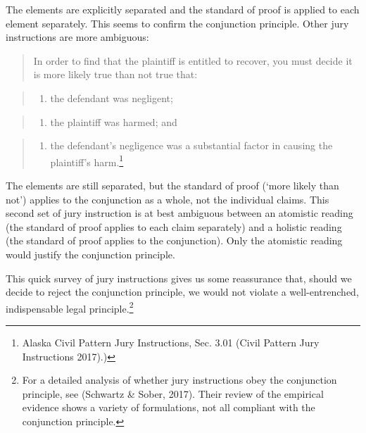 \documentclass[
  10pt,
  dvipsnames,enabledeprecatedfontcommands]{scrartcl}
\providecommand{\tightlist}{%
  \setlength{\itemsep}{0pt}\setlength{\parskip}{0pt}}
\begin{document}
\noindent The elements are explicitly separated and the standard of
proof is applied to each element separately. This seems to confirm the
conjunction principle. Other jury instructions are more ambiguous:

\begin{quote}
In order to find that the plaintiff is entitled to recover, you must
decide it is more likely true than not true that:
\end{quote}

\begin{quote}
\begin{enumerate}
\def\labelenumi{\arabic{enumi}.}
\tightlist
\item
  the defendant was negligent;
\end{enumerate}
\end{quote}

\begin{quote}
\begin{enumerate}
\def\labelenumi{\arabic{enumi}.}
\setcounter{enumi}{1}
\tightlist
\item
  the plaintiff was harmed; and
\end{enumerate}
\end{quote}

\begin{quote}
\begin{enumerate}
\def\labelenumi{\arabic{enumi}.}
\setcounter{enumi}{2}
\tightlist
\item
  the defendant's negligence was a substantial factor in causing the
  plaintiff's harm.\footnote{Alaska Civil Pattern Jury Instructions,
    Sec. 3.01 (Civil Pattern Jury Instructions 2017).)}
\end{enumerate}
\end{quote}

\noindent The elements are still separated, but the standard of proof
(`more likely than not') applies to the conjunction as a whole, not the
individual claims. This second set of jury instruction is at best
ambiguous between an atomistic reading (the standard of proof applies to
each claim separately) and a holistic reading (the standard of proof
applies to the conjunction). Only the atomistic reading would justify
the conjunction principle.

This quick survey of jury instructions gives us some reassurance that,
should we decide to reject the conjunction principle, we would not
violate a well-entrenched, indispensable legal principle.\footnote{For a
  detailed analysis of whether jury instructions obey the conjunction
  principle, see (Schwartz \& Sober, 2017). Their review of the
  empirical evidence shows a variety of formulations, not all compliant
  with the conjunction principle.}
\end{document}
